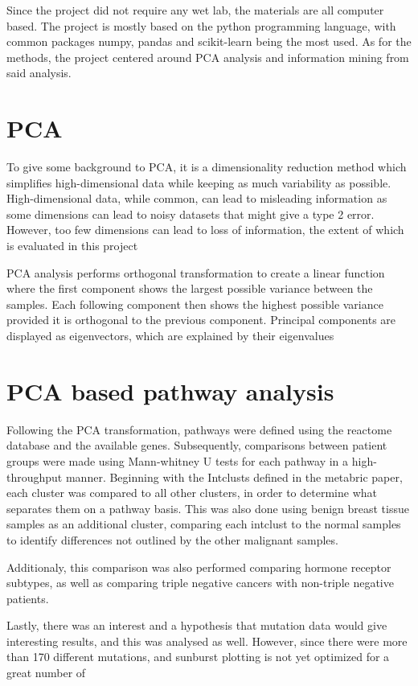 \documentclass{kththesis}
\begin{document}
     Since the project did not require any wet lab, the materials are all computer based. The project is mostly based on the python programming language, with common packages numpy, pandas and scikit-learn being the most used. As for the methods, the project centered around PCA analysis and information mining from said analysis.


     \section{PCA}
     To give some background to PCA, it is a dimensionality reduction method which simplifies high-dimensional data while keeping as much variability as possible. High-dimensional data, while common, can lead to misleading information as some dimensions can lead to noisy datasets that might give a type 2 error. However, too few dimensions can lead to loss of information, the extent of which is evaluated in this project

     PCA analysis performs orthogonal transformation to create a linear function where the first component shows the largest possible variance between the samples. Each following component then shows the highest possible variance provided it is orthogonal to the previous component. Principal components are displayed as eigenvectors, which are explained by their eigenvalues


     \section{PCA based pathway analysis}
     Following the PCA transformation, pathways were defined using the reactome database and the available genes. Subsequently, comparisons between patient groups were made using Mann-whitney U tests for each pathway in a high-throughput manner. Beginning with the Intclusts defined in the metabric paper, each cluster was compared to all other clusters, in order to determine what separates them on a pathway basis. This was also done using benign breast tissue samples as an additional cluster, comparing each intclust to the normal samples to identify differences not outlined by the other malignant samples.

     Additionaly, this comparison was also performed comparing hormone receptor subtypes, as well as comparing triple negative cancers with non-triple negative patients.

     Lastly, there was an interest and a hypothesis that mutation data would give interesting results, and this was analysed as well. However, since there were more than 170 different mutations, and sunburst plotting is not yet optimized for a great number of
\end{document}
